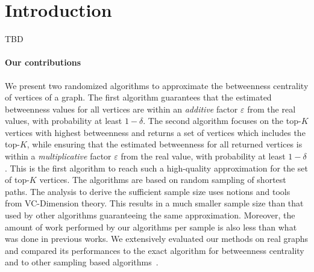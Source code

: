 \section{Introduction}\label{sec:intro}
\XXX TBD

\paragraph{Our contributions} 
We present two randomized algorithms to approximate the betweenness centrality
of vertices of a graph. The first algorithm guarantees that the estimated betweenness
values for all vertices are within an \emph{additive} factor $\varepsilon$ from the
real values, with probability at least $1-\delta$. The second algorithm focuses
on the top-$K$ vertices with highest betweenness and returns a set of vertices
which includes the top-$K$, while ensuring that the estimated betweenness for
all returned vertices is within a \emph{multiplicative} factor $\varepsilon$
from the real value, with probability at least $1-\delta$. This is the first
algorithm to reach such a high-quality approximation for the set of top-$K$
vertices. The algorithms are based on random sampling of shortest paths. The
analysis to derive the sufficient sample size uses notions and tools from
VC-Dimension theory. This results in a much smaller sample size than that used
by other algorithms guaranteeing the same approximation. Moreover, the amount of
work performed by our algorithms per sample is also less than what was done in
previous works.  We extensively evaluated our methods on real graphs and
compared its performances to the exact algorithm for betweenness
centrality~\citep{Brandes01} and to other sampling based
algorithms~\citep{BrandesP07,JacobKLPT05}.


